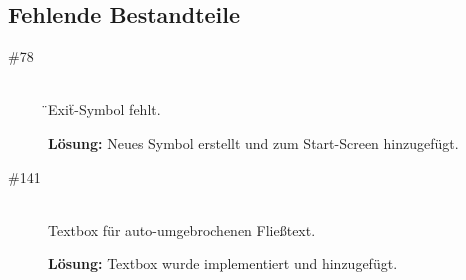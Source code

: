 %



\subsection*{Fehlende Bestandteile}
\begin{description}

\item[\#78] \hfill \\
\"{}Exit\"{}-Symbol fehlt.
 
 {\bfseries Lösung:} Neues Symbol erstellt und zum Start-Screen hinzugefügt.
 
\item[\#141] \hfill \\
 Textbox für auto-umgebrochenen Fließtext.
 
  {\bfseries Lösung:} Textbox wurde implementiert und hinzugefügt.
  
  \end{description}
~\\